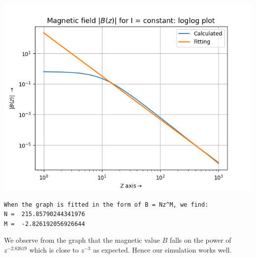 \documentclass[12pt, a4paper]{report}
\begin{document}
\begin{center}
	\includegraphics[scale=0.65]{Figure_5.png} 
	\label{fig:rawdata}
\end{center}

\begin{verbatim}
When the graph is fitted in the form of B = Nz^M, we find:
N =  215.85790244341976
M =  -2.826192056926644
\end{verbatim}
\clearpage
We observe from the graph that the magnetic value $B$ falls on the power of $z^{-2.82619}$ which is close to $z^{-3}$ as expected. Hence our simulation works well.
\\
\end{document}
